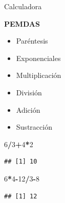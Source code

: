 \documentclass[ignorenonframetext,]{beamer}
\newenvironment{Shaded}{\begin{snugshade}}{\end{snugshade}}
\newcommand{\DecValTok}[1]{\textcolor[rgb]{0.00,0.00,0.81}{#1}}
\newcommand{\OperatorTok}[1]{\textcolor[rgb]{0.81,0.36,0.00}{\textbf{#1}}}
\providecommand{\tightlist}{%
  \setlength{\itemsep}{0pt}\setlength{\parskip}{0pt}}
\begin{document}
\begin{frame}[fragile]{Calculadora}

\textbf{PEMDAS}

\begin{itemize}
\tightlist
\item
  Paréntesis
\item
  Exponenciales
\item
  Multiplicación
\item
  División
\item
  Adición
\item
  Sustracción
\end{itemize}

\begin{Shaded}
\begin{Highlighting}[]
\DecValTok{6}\OperatorTok{/}\DecValTok{3}\OperatorTok{+}\DecValTok{4}\OperatorTok{*}\DecValTok{2}
\end{Highlighting}
\end{Shaded}

\pause
\begin{verbatim}
## [1] 10
\end{verbatim}

\begin{Shaded}
\begin{Highlighting}[]
\DecValTok{6}\OperatorTok{*}\DecValTok{4}\OperatorTok{-}\DecValTok{12}\OperatorTok{/}\DecValTok{3}\OperatorTok{-}\DecValTok{8}
\end{Highlighting}
\end{Shaded}

\pause
\begin{verbatim}
## [1] 12
\end{verbatim}

\end{frame}
\end{document}
